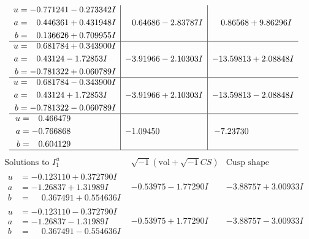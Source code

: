 \documentclass[1p]{elsarticle_modified}
\theoremstyle{definition}
\newcommand{\I}{\sqrt{-1}}
\begin{document}
$$\begin{array}{c|c|c}
\begin{aligned}
u &= -0.771241 - 0.273342 I \\
a &= \phantom{-}0.446361 + 0.431948 I \\
b &= \phantom{-}0.136626 + 0.709955 I\end{aligned}
 & \phantom{-}0.64686 - 2.83787 I & \phantom{-}0.86568 + 9.86296 I \\ \hline\begin{aligned}
u &= \phantom{-}0.681784 + 0.343900 I \\
a &= \phantom{-}0.43124 - 1.72853 I \\
b &= -0.781322 + 0.060789 I\end{aligned}
 & -3.91966 - 2.10303 I & -13.59813 + 2.08848 I \\ \hline\begin{aligned}
u &= \phantom{-}0.681784 - 0.343900 I \\
a &= \phantom{-}0.43124 + 1.72853 I \\
b &= -0.781322 - 0.060789 I\end{aligned}
 & -3.91966 + 2.10303 I & -13.59813 - 2.08848 I \\ \hline\begin{aligned}
u &= \phantom{-}0.466479\phantom{ +0.000000I} \\
a &= -0.766868\phantom{ +0.000000I} \\
b &= \phantom{-}0.604129\phantom{ +0.000000I}\end{aligned}
 & -1.09450\phantom{ +0.000000I} & -7.23730\phantom{ +0.000000I}\\
 \hline 
 \end{array}$$\newpage$$\begin{array}{c|c|c}  
\text{Solutions to }I^u_{1}& \I (\text{vol} + \sqrt{-1}CS) & \text{Cusp shape}\\
 \hline 
\begin{aligned}
u &= -0.123110 + 0.372790 I \\
a &= -1.26837 + 1.31989 I \\
b &= \phantom{-}0.367491 + 0.554636 I\end{aligned}
 & -0.53975 - 1.77290 I & -3.88757 + 3.00933 I \\ \hline\begin{aligned}
u &= -0.123110 - 0.372790 I \\
a &= -1.26837 - 1.31989 I \\
b &= \phantom{-}0.367491 - 0.554636 I\end{aligned}
 & -0.53975 + 1.77290 I & -3.88757 - 3.00933 I \\ \hline\begin{aligned}

\end{aligned}
\end{array}$$
\end{document}
